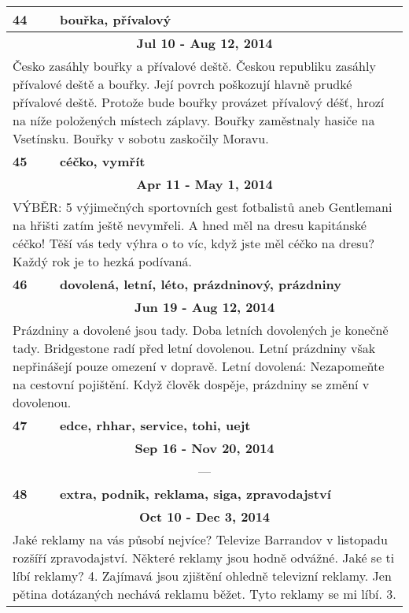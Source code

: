 \begin{tabularx}{\linewidth}{l l}
\bf 44 & \bf bouřka, přívalový \\ \midrule
\multicolumn{2}{c}{\bf Jul 10 - Aug 12, 2014} \\
\multicolumn{2}{p{\linewidth}}{Česko zasáhly bouřky a přívalové deště. Českou republiku zasáhly přívalové deště a bouřky. Její povrch poškozují hlavně prudké přívalové deště. Protože bude bouřky provázet přívalový déšť, hrozí na níže položených místech záplavy. Bouřky zaměstnaly hasiče na Vsetínsku. Bouřky v sobotu zaskočily Moravu.} \\ \midrule[1.5pt]

\bf 45 & \bf céčko, vymřít \\ \midrule
\multicolumn{2}{c}{\bf Apr 11 - May 1, 2014} \\
\multicolumn{2}{p{\linewidth}}{VÝBĚR: 5 výjimečných sportovních gest fotbalistů aneb Gentlemani na hřišti zatím ještě nevymřeli. A hned měl na dresu kapitánské céčko! Těší vás tedy výhra o to víc, když jste měl céčko na dresu? Každý rok je to hezká podívaná.} \\ \midrule[1.5pt]

\bf 46 & \bf dovolená, letní, léto, prázdninový, prázdniny \\ \midrule
\multicolumn{2}{c}{\bf Jun 19 - Aug 12, 2014} \\
\multicolumn{2}{p{\linewidth}}{Prázdniny a dovolené jsou tady. Doba letních dovolených je konečně tady. Bridgestone radí před letní dovolenou. Letní prázdniny však nepřinášejí pouze omezení v dopravě. Letní dovolená: Nezapomeňte na cestovní pojištění. Když člověk dospěje, prázdniny se změní v dovolenou.} \\ \midrule[1.5pt]

\bf 47 & \bf edce, rhhar, service, tohi, uejt \\ \midrule
\multicolumn{2}{c}{\bf Sep 16 - Nov 20, 2014} \\
\multicolumn{2}{c}{---} \\ \midrule[1.5pt]

\bf 48 & \bf extra, podnik, reklama, siga, zpravodajství \\ \midrule
\multicolumn{2}{c}{\bf Oct 10 - Dec 3, 2014} \\
\multicolumn{2}{p{\linewidth}}{Jaké reklamy na vás působí nejvíce? Televize Barrandov v listopadu rozšíří zpravodajství. Některé reklamy jsou hodně odvážné. Jaké se ti líbí reklamy? 4. Zajímavá jsou zjištění ohledně televizní reklamy. Jen pětina dotázaných nechává reklamu běžet. Tyto reklamy se mi líbí. 3.} \\ \midrule[1.5pt]


\end{tabularx}
